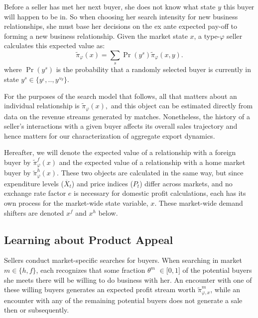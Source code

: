 Before a seller has met her next buyer, she does not know what state $y$
this buyer will happen to be in. So when choosing her search intensity for
new business relationships, she must base her decisions on the ex ante
expected pay-off to forming a new business relationship. Given the market
state $x$, a type-$\varphi $ seller calculates this expected value as:%
\begin{equation*}
\widetilde{\pi }_{\varphi }(x)=\sum_{s}\Pr (y^{s})\widetilde{\pi }_{\varphi
}(x,y).
\end{equation*}%
where $\Pr (y^{s})$ is the probability that a randomly selected buyer is
currently in state $y^{s}\in \{y^{_{1}},..,y^{_{Ny}}\}$.\footnotemark{}

For the purposes of the search model that follows, all that matters about an
individual relationship is $\widetilde{\pi }_{\varphi }(x),$ and this object
can be estimated directly from data on the revenue streams generated by
matches. Nonetheless, the history of a seller's interactions with a given
buyer affects its overall sales trajectory and hence matters for our
characterization of aggregate export dynamics.

Hereafter, we will denote the expected value of a relationship with a
foreign buyer by $\widetilde{\pi }_{\varphi }^{f}(x)$ and the expected value
of a relationship with a home market buyer by $\widetilde{\pi }_{\varphi
}^{h}(x).$ These two objects are calculated in the same way, but since
expenditure levels ($\overline{X}_{t}$) and price indices ($P_{t}$) differ
across markets, and no exchange rate factor $e$ is necessary for domestic
profit calculations, each has its own process for the market-wide state
variable, $x.$ These market-wide demand shifters are denoted $x^{f}$ and $%
x^{h}$ below$.$

\subsection{Learning about Product Appeal}

Sellers conduct market-specific searches for buyers. When searching in
market $m\in \{h,f\}$, each recognizes that some fraction $\theta ^{m}$ $\in
\lbrack 0,1]$ of the potential buyers she meets there will be willing to do
business with her. An encounter with one of these willing buyers generates
an expected profit stream worth $\widetilde{\pi }_{\varphi ,x}^{m}$, while
an encounter with any of the remaining potential buyers does not generate a
sale then or subsequently.


